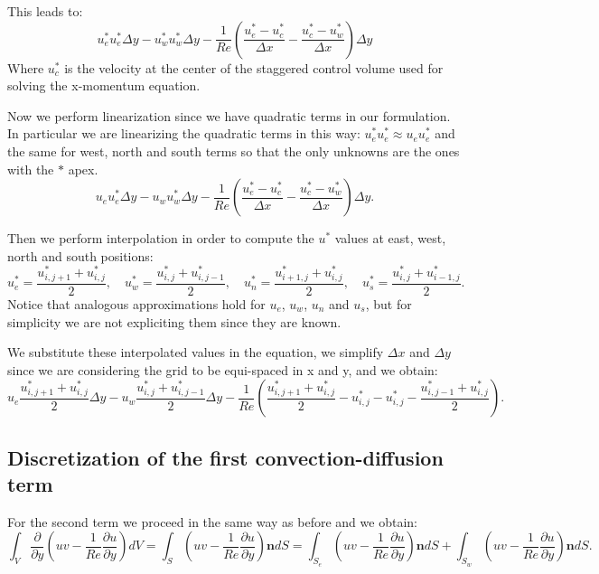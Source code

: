 \documentclass{article}
\begin{document}
This leads to:
\begin{equation*}
  u_e^* u_e^* \Delta y - u_w^* u_w^* \Delta y - \frac{1}{Re} \left( \frac{u_e^* - u_c^*}{\Delta x} - \frac{u_c^* - u_w^*}{\Delta x}\right) \Delta y
\end{equation*}
Where $u_c^*$ is the velocity at the center of the staggered control volume used for solving the x-momentum equation.

Now we perform linearization since we have quadratic terms in our formulation. In particular we are linearizing the quadratic terms in this way: $u_e^* u_e^* \approx u_e u_e^*$ and the same for west, north and south terms so that the only unknowns are the ones with the $*$ apex.
\begin{equation*}
  u_e u_e^* \Delta y - u_w u_w^* \Delta y - \frac{1}{Re} \left( \frac{u_e^* - u_c^*}{\Delta x} - \frac{u_c^* - u_w^*}{\Delta x}\right) \Delta y.
\end{equation*}

Then we perform interpolation in order to compute the $u^*$ values at east, west, north and south positions:
\begin{equation*}
  u_e^* = \frac{u_{i,j+1}^* + u_{i,j}^*}{2}, \quad u_w^* = \frac{u_{i,j}^* + u_{i,j-1}^*}{2}, \quad u_n^* = \frac{u_{i+1,j}^* + u_{i,j}^*}{2}, \quad u_s^* = \frac{u_{i,j}^* + u_{i-1,j}^*}{2}.
\end{equation*}
Notice that analogous approximations hold for $u_e$, $u_w$, $u_n$ and $u_s$, but for simplicity we are not expliciting them since they are known.

We substitute these interpolated values in the equation, we simplify $\Delta x$ and $\Delta y$ since we are considering the grid to be equi-spaced in x and y, and we obtain:
\begin{equation}
  u_e \frac{u_{i,j+1}^* + u_{i,j}^*}{2} \Delta y - u_w \frac{u_{i,j}^* + u_{i,j-1}^*}{2} \Delta y - \frac{1}{Re} \left( \frac{u_{i,j+1}^* + u_{i,j}^*}{2} - u_{i,j}^* - u_{i,j}^* - \frac{u_{i,j-1}^* + u_{i,j}^*}{2}\right).
\end{equation}

\subsection*{Discretization of the first convection-diffusion term}
For the second term we proceed in the same way as before and we obtain:
\begin{equation*}
   \int_{V} \frac{\partial}{\partial y} (uv - \frac{1}{Re} \frac{\partial u}{\partial y}) dV = \int_{S} (uv - \frac{1}{Re} \frac{\partial u}{\partial y}) \mathbf{n} dS = \int_{S_{e}} (uv - \frac{1}{Re} \frac{\partial u}{\partial y}) \mathbf{n} dS + \int_{S_w} (uv - \frac{1}{Re} \frac{\partial u}{\partial y}) \mathbf{n} dS.
\end{equation*}
\end{document}

